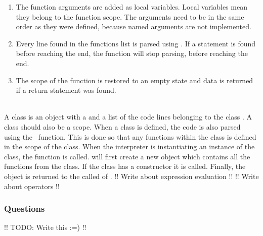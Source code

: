 \begin{enumerate}
    \item The function arguments are added as local variables. Local variables mean they belong to the function scope. The arguments need to be in the same order as they were defined, because named arguments are not implemented.
    \item Every line found in the functions  list is parsed using . If a  statement is found before reaching the end, the function will stop parsing, before reaching the end.
    \item The scope of the function is restored to an empty state and data is returned if a return statement was found.
\end{enumerate}
\\[11pt]
A class is an object with a  and a list of the code lines belonging to the class . A class should also be a scope. When a class is defined, the code is also parsed using the  function. This is done so that any functions within the class is defined in the scope of the class. When the interpreter is instantiating an instance of the class, the  function is called.  will first create a new object which contains all the functions from the class. If the class has a constructor it is called. Finally, the object is returned to the called of .
!! Write about expression evaluation !!
!! Write about operators !!

\subsubsection{Questions}
!! TODO: Write this :=) !!